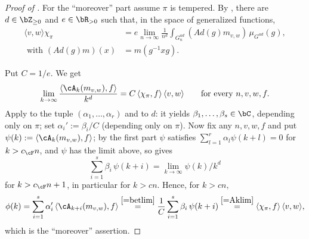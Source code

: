 \documentclass[12pt,a4paper]{amsart}%
\newcommand{\RamiD}[1]{{{#1}}}
\newcommand{\DimaA}[1]{{{#1}}}
\begin{document}
\begin{proof}[Proof of ]
For the ``moreover'' part assume $\pi$ is tempered. By , there are $d\in\Z_{\geq 0}$ and $e\in\R_{>0}$ such that, in the space of generalized functions,
\begin{align*}
\langle v,w\rangle \chi_\pi&=e\lim_{n\to\infty}\frac{1}{n^{d}}\int_{G^{ad}_n}(Ad(g)m_{v,w})\,\mu_{G^{ad}}(g),\\
\text{ with } (Ad(g)m)(x)&=m(g^{-1}xg).
\end{align*}

Put $C=1/e$. We get
\begin{equation}\label{=Aklim}  
\lim_{k\to\infty}\frac{\langle\cA_k(m_{v,w}),f\rangle}{k^{d}}=C\,\langle\chi_\pi,f\rangle\,\langle v,w\rangle\qquad\text{for every }n,v,w,f.
\end{equation}
Apply  to the tuple $(\alpha_1,\dots,\alpha_r)$ and to $d$: it yields $\beta_1,\dots,\beta_s\in\C$, depending only on $\pi$; set $\alpha_i':=\beta_i/C$ (depending only on $\pi$). Now fix any $n,v,w,f$ and put $\psi(k):=\langle\cA_k(m_{v,w}),f\rangle$; by the first part $\psi$ satisfies $\sum_{l=1}^r\alpha_l\psi(k+l)=0$ for $k>c_{\cF}n$, and $\psi$ has the limit above, so  gives \begin{equation}\label{=betlim}
\sum_{i=1}^s\beta_i\,\psi(k+i)=\lim_{k\to\infty}\psi(k)/k^{d}\end{equation} for $k>c_{\cF}n+1$, in particular for $k>\RamiD{c}n$. Hence, for $k>\RamiD{c}n,$
\begin{align*}
\phi(k)=\sum_{i=1}^s\alpha_i'\,\langle\cA_{k+i}(m_{v,w}),f\rangle\overset{\DimaA{\eqref{=betlim}}}{=}\frac1C\sum_{i=1}^s\beta_i\,\psi(k+i)
\overset{\DimaA{\eqref{=Aklim}}}{=}\langle\chi_\pi,f\rangle\,\langle v,w\rangle,
\end{align*}
which is the ``moreover'' assertion\DimaA{.}
\end{proof}
\appendix
\end{document}
